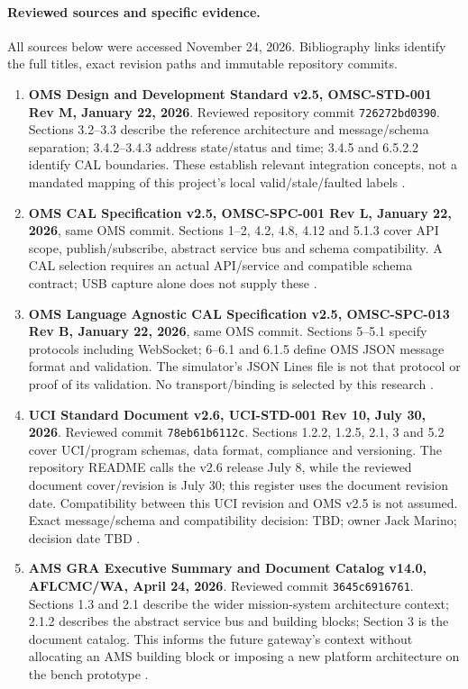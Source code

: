 \paragraph{Reviewed sources and specific evidence.}
All sources below were accessed November 24, 2026. Bibliography links identify
the full titles, exact revision paths and immutable repository commits.
\begin{enumerate}
\item \textbf{OMS Design and Development Standard v2.5, OMSC-STD-001 Rev M,
January 22, 2026}. Reviewed repository commit
\texttt{726272bd0390}. Sections 3.2--3.3 describe the reference architecture
and message/schema separation; 3.4.2--3.4.3 address state/status and time;
3.4.5 and 6.5.2.2 identify CAL boundaries. These establish relevant integration
concepts, not a mandated mapping of this project's local valid/stale/faulted
labels \cite{OMS25Standard}.
\item \textbf{OMS CAL Specification v2.5, OMSC-SPC-001 Rev L,
January 22, 2026}, same OMS commit. Sections 1--2, 4.2, 4.8, 4.12 and 5.1.3
cover API scope, publish/subscribe, abstract service bus and schema
compatibility. A CAL selection requires an actual API/service and compatible
schema contract; USB capture alone does not supply these \cite{OMS25CAL}.
\item \textbf{OMS Language Agnostic CAL Specification v2.5,
OMSC-SPC-013 Rev B, January 22, 2026}, same OMS commit. Sections 5--5.1
specify protocols including WebSocket; 6--6.1 and 6.1.5 define OMS JSON message
format and validation. The simulator's JSON Lines file is not that protocol or
proof of its validation. No transport/binding is selected by this research
\cite{OMS25LACAL}.
\item \textbf{UCI Standard Document v2.6, UCI-STD-001 Rev 10,
July 30, 2026}. Reviewed commit \texttt{78eb61b6112c}. Sections 1.2.2,
1.2.5, 2.1, 3 and 5.2 cover UCI/program schemas, data format, compliance and
versioning. The repository README calls the v2.6 release July 8, while the
reviewed document cover/revision is July 30; this register uses the document
revision date. Compatibility between this UCI revision and OMS v2.5 is not
assumed. Exact message/schema and compatibility decision: TBD; owner Jack
Marino; decision date TBD \cite{UCI26Standard}.
\item \textbf{AMS GRA Executive Summary and Document Catalog v14.0,
AFLCMC/WA, April 24, 2026}. Reviewed commit \texttt{3645c6916761}.
Sections 1.3 and 2.1 describe the wider mission-system architecture context;
2.1.2 describes the abstract service bus and building blocks; Section 3
is the document catalog. This informs the future gateway's context without
allocating an AMS building block or imposing a new platform architecture on
the bench prototype \cite{AMSGRA14}.
\end{enumerate}
